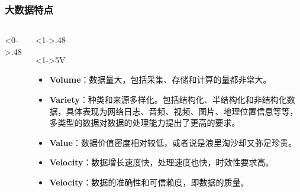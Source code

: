 \documentclass[10pt,aspectratio=43,mathserif,table]{beamer}
\begin{document}
\begin{frame}
	\frametitle{大数据特点}
	\begin{columns}[T] %
		\begin{column}<0->{.48\textwidth}
			\begin{figure}[thpb]
				\centering
				\label{fig:campus}
			\end{figure}
		\end{column}%
		\hfill%
		\begin{column}<1->{.48\textwidth}
		\begin{block}<1->{5V}
			\begin{itemize}
				\item<1-> {\color{blue}\textbf{Volume}}：数据量大，包括采集、存储和计算的量都非常大。
				\item<1-> {\color{blue}\textbf{Variety}}：种类和来源多样化。包括结构化、半结构化和非结构化数据，具体表现为网络日志、音频、视频、图片、地理位置信息等等，多类型的数据对数据的处理能力提出了更高的要求。
				\item<1-> {\color{blue}\textbf{Value}}：数据价值密度相对较低，或者说是浪里淘沙却又弥足珍贵。
				\item<1-> {\color{blue}\textbf{Velocity}}：数据增长速度快，处理速度也快，时效性要求高。
				\item<1-> {\color{blue}\textbf{Velocity}}：数据的准确性和可信赖度，即数据的质量。
			\end{itemize}		
		\end{block}
		\end{column}%
	\end{columns}
\end{frame}
\end{document}
